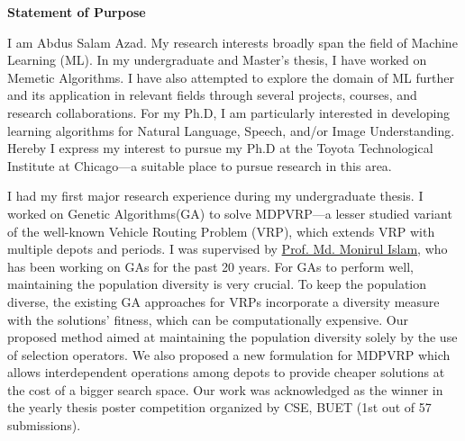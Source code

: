 \documentclass[12pt]{article}
\begin{document}


\fancyhf{}
\rfoot{\thepage}

\begin{center}
{\LARGE \bf 
Statement of Purpose}\\
\end{center}


 
I am Abdus Salam Azad. My research interests broadly span the field of Machine Learning (ML). In my undergraduate and Master's thesis, I have worked on Memetic Algorithms. I have also attempted to explore the domain of ML further and its application in relevant fields through several projects, courses, and research collaborations. For my Ph.D, I am particularly interested in developing learning algorithms for Natural Language, Speech, and/or Image Understanding. Hereby I express my interest to pursue my Ph.D at the Toyota Technological Institute at Chicago---a suitable place to pursue research in this area.  

I had my first major research experience during my undergraduate thesis. I worked on Genetic Algorithms(GA) to solve MDPVRP---a lesser studied variant of the well-known Vehicle Routing Problem (VRP), which extends VRP with multiple depots and periods. I was supervised by \href{http://cse.buet.ac.bd/faculty/facdetail.php?id=mdmonirulislam}{Prof. Md. Monirul Islam}, who has been working on GAs for the past 20 years. For GAs to perform well, maintaining the population diversity is very crucial. To keep the population diverse, the existing GA approaches for VRPs incorporate a diversity measure with the solutions' fitness, which can be computationally expensive. Our proposed method aimed at maintaining the population diversity solely by the use of selection operators. We also proposed a new formulation for MDPVRP which allows interdependent operations among depots to provide cheaper solutions at the cost of a bigger search space. Our work was acknowledged as the winner in the yearly thesis poster competition organized by CSE, BUET (1st out of 57 submissions).
\end{document}
